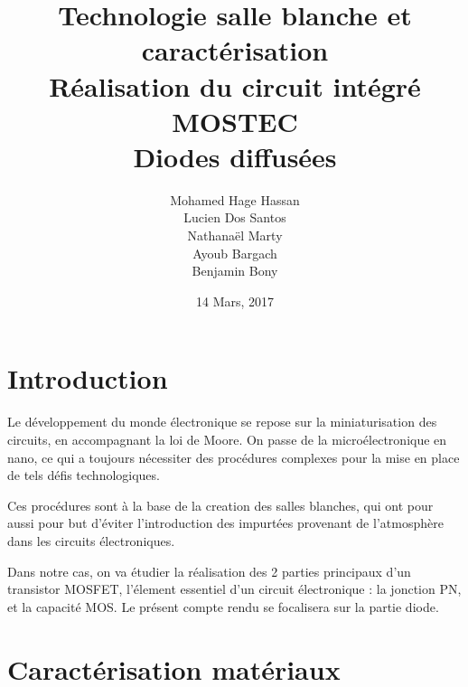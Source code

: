 \documentclass[11pt]{article}
\begin{document}
\title{\textbf{Technologie salle blanche et caract\'erisation}\\ R\'ealisation du circuit int\'egr\'e MOSTEC \\ Diodes diffus\'ees}
\author{Mohamed Hage Hassan \\ Lucien Dos Santos \\ Nathanaël Marty \\ Ayoub Bargach \\ Benjamin Bony}
\date{14 Mars, 2017}
\maketitle

\tableofcontents
\clearpage

\section{Introduction}
Le d\'eveloppement du monde \'electronique se repose sur la miniaturisation des circuits, en accompagnant la loi de Moore. On passe de la micro\'electronique en nano, ce qui a toujours n\'ecessiter des proc\'edures complexes pour la mise en place de tels d\'efis technologiques. 

Ces proc\'edures sont \`a la base de la creation des salles blanches, qui ont pour aussi pour but d'\'eviter l'introduction des impurt\'ees provenant de l'atmosph\`ere dans les circuits \'electroniques.

Dans notre cas, on va \'etudier la r\'ealisation des 2 parties principaux d'un transistor MOSFET, l'\'element essentiel d'un circuit \'electronique : la jonction PN, et la capacit\'e MOS. Le pr\'esent compte rendu se focalisera sur la partie diode.


\section{Caract\'erisation mat\'eriaux}
\end{document}
